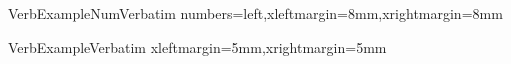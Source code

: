 \clearpage{\thispagestyle{empty}\cleardoublepage}
\makeatletter
\newcommand{\elv}{\leavevmode\nobreak-\hskip\z@skip}
\makeatother


\baselineskip=0pt
\parskip=0pt



\newcommand{\xml}{\textsc{xml}\xspace}

\newcommand*{\utbeh}{\hspace*{3mm}}

\newcommand{\ut}[1]{\hspace*{3mm}\mbox{\vspace{2mm}\texttt{#1}\vspace{2mm}}}

\DefineVerbatimEnvironment%
{VerbExampleNum}{Verbatim}
{numbers=left,xleftmargin=8mm,xrightmargin=8mm}

\DefineVerbatimEnvironment%
{VerbExample}{Verbatim}
{xleftmargin=5mm,xrightmargin=5mm}
